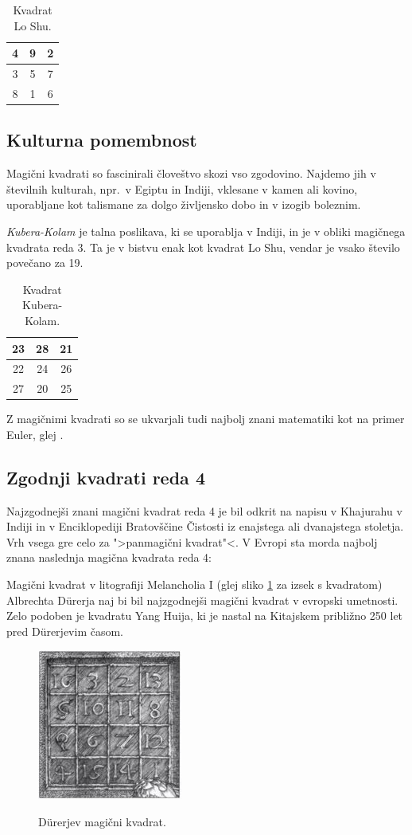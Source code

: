 \documentclass[a4paper,12pt]{article}
\theoremstyle{definition}
\newenvironment{magic}[3]{
    \begin{table}[h]
        \centering
        \caption{#1}
        \label{#3}
        \large
        \begin{tabular}{|*{#2}{c|}}
            \hline
            }
            {
        \end{tabular}
        \normalsize
    \end{table}
}
\newcommand{\pojem}[1]{\emph{\color{purple}#1}}
\begin{document}
\begin{magic}{Kvadrat Lo Shu.}{3}{table:loshu}
        4 & 9 & 2 \\\hline
        3 & 5 & 7 \\\hline
        8 & 1 & 6 \\\hline
\end{magic}


\subsection{Kulturna pomembnost}

Magični kvadrati so fascinirali človeštvo skozi vso zgodovino. Najdemo jih v številnih kulturah, npr.\ v Egiptu in Indiji, vklesane v kamen ali kovino, uporabljane kot talismane za dolgo življensko dobo in v izogib boleznim.

\pojem{Kubera-Kolam} je talna poslikava, ki se uporablja v Indiji, in je v
obliki magičnega kvadrata reda 3. Ta je v bistvu enak kot kvadrat
Lo Shu, vendar je vsako število povečano za 19.

\begin{magic}{Kvadrat Kubera-Kolam.}{3}{table:kubera}
        23 & 28 & 21 \\\hline
        22 & 24 & 26 \\\hline
        27 & 20 & 25 \\\hline
\end{magic}

Z magičnimi kvadrati so se ukvarjali tudi najbolj znani matematiki kot na primer Euler, glej \cite{euler}. %


\subsection{Zgodnji kvadrati reda 4}

Najzgodnejši znani magični kvadrat reda 4 je bil odkrit na napisu v Khajurahu v Indiji in v Enciklopediji Bratovščine Čistosti iz enajstega ali dvanajstega stoletja. Vrh vsega gre celo za ">panmagični kvadrat"<. V Evropi sta morda najbolj znana naslednja magična kvadrata reda 4:

Magični kvadrat v litografiji Melancholia I (glej sliko \ref{fig:durer} za izsek s kvadratom) Albrechta Dürerja naj bi bil najzgodnejši magični kvadrat v evropski umetnosti. Zelo podoben je kvadratu Yang Huija, ki je nastal na Kitajskem približno 250 let pred Dürerjevim časom. %

\begin{figure}
    \centering
    \caption{Dürerjev magični kvadrat.}
    \includegraphics[scale=1.5]{img/durer.png}
    \label{fig:durer}
\end{figure}
\end{document}
